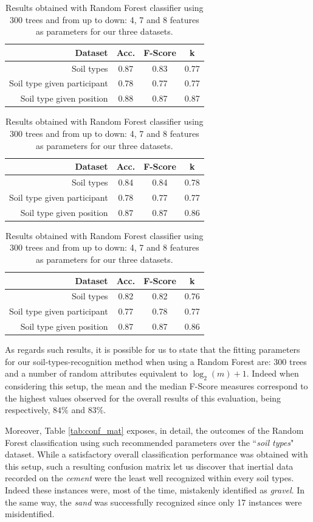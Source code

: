 \documentclass[conference]{IEEEtran}
\begin{document}
\begin{table}[!ht]
  \centering
  \caption{Results obtained with Random Forest classifier using 300 trees and from up to down: 4, 7 and 8 features as parameters for our three datasets.}
  \label{tab:results_300}
  \begin{tabular}{rccc}
    \toprule
    \textbf{Dataset}&\textbf{Acc.}&\textbf{F-Score}&\textbf{k}\\
    \midrule
   	Soil types&0.87&0.83&0.77\\
    Soil type given participant&0.78&0.77&0.77\\
    Soil type given position&0.88&0.87&0.87\\
\end{tabular}
\begin{tabular}{rccc}
    \toprule
    \textbf{Dataset}&\textbf{Acc.}&\textbf{F-Score}&\textbf{k}\\
    \midrule
   	Soil types&0.84&0.84&0.78\\
    Soil type given participant&0.78&0.77&0.77\\
    Soil type given position&0.87&0.87&0.86\\
\end{tabular}
\begin{tabular}{rccc}
    \toprule
    \textbf{Dataset}&\textbf{Acc.}&\textbf{F-Score}&\textbf{k}\\
    \midrule
   	Soil types&0.82&0.82&0.76\\
    Soil type given participant&0.77&0.78&0.77\\
    Soil type given position&0.87&0.87&0.86\\
  \bottomrule
\end{tabular}
\end{table}

As regards such results, it is possible for us to state that the fitting parameters for our soil-types-recognition method when using a Random Forest are: 300 trees and a number of random attributes equivalent to $\log_2(m) + 1$. Indeed when considering this setup, the mean and the median F-Score measures correspond to the highest values observed for the overall results of this evaluation, being respectively, $84\%$ and $83\%$. 

Moreover, Table \ref{tab:conf_mat} exposes, in detail, the outcomes of the Random Forest classification using such recommended parameters over the \textquotedblleft\textit{soil types}" dataset. While a satisfactory overall classification performance was obtained with this setup, such a resulting confusion matrix let us discover that inertial data recorded on the \textit{cement} were the least well recognized within every soil types. Indeed these instances were, most of the time, mistakenly identified as \textit{gravel}. In the same way, the \textit{sand} was successfully recognized since only 17 instances were misidentified.
\end{document}
